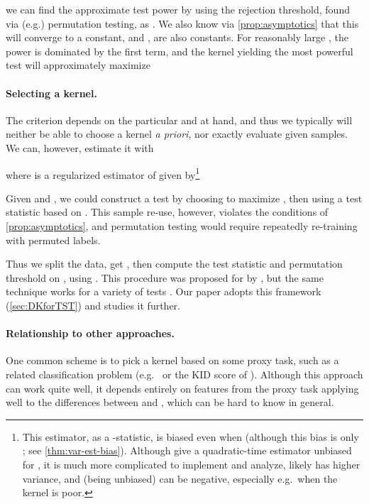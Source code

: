 \documentclass{article}
\begin{document}
we can find the approximate test power by using the rejection threshold, found via (e.g.) permutation testing, as .
We also know via \cref{prop:asymptotics} that this  will converge to a constant,
and ,  are also constants.
For reasonably large ,
the power is dominated by the first term,
and the kernel yielding the most powerful test will approximately maximize \citep{sutherland:mmd-opt}


\paragraph{Selecting a kernel.}
The criterion  depends on the particular  and  at hand,
and thus we typically will neither be able to choose a kernel \emph{a priori},
nor exactly evaluate  given samples.
We can, however, estimate it with

where  is a regularized estimator of 
given by\footnote{This estimator, as a -statistic, is biased even when 
(although this bias is only ; see \cref{thm:var-est-bias}).
Although \citet{sutherland:mmd-opt,unbiased-var-ests} give a quadratic-time estimator unbiased for ,
it is much more complicated to implement and analyze,
likely has higher variance,
and (being unbiased) can be negative,
especially e.g.\ when the kernel is poor.}


Given  and ,
we could construct a test by choosing  to maximize ,
then using a test statistic based on .
This sample re-use, however,
violates the conditions of \cref{prop:asymptotics},
and permutation testing would require repeatedly re-training  with permuted labels.

Thus we split the data,
get ,
then compute the test statistic and permutation threshold on ,  using .
This procedure was proposed for  by \citet{sutherland:mmd-opt},
but the same technique works for a variety of tests
\citep{Gretton2012NeurIPS,Jitkrittum2016,Jitkrittum2017,Lopez:C2ST}.
Our paper adopts this framework (\cref{sec:DKforTST})
and studies it further.

\paragraph{Relationship to other approaches.}
One common scheme is to pick a kernel  based on some proxy task,
such as a related classification problem
(e.g.\ \citealt{Matthias:deep-test} or the KID score of \citealt{MMD_GAN}).
Although this approach can work quite well,
it depends entirely on features from the proxy task applying well to the differences between  and ,
which can be hard to know in general.
\end{document}
